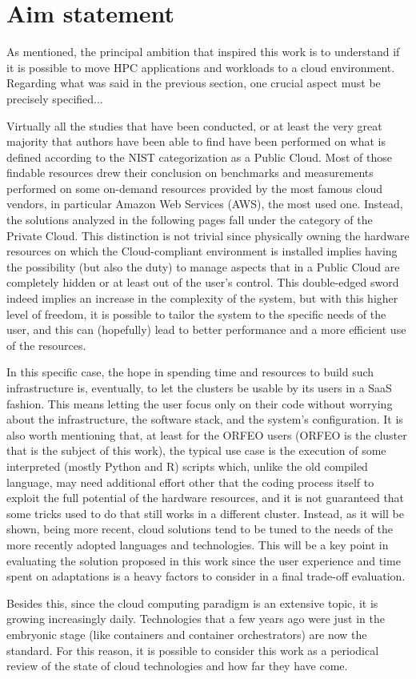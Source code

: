 \section*{Aim statement}

As mentioned, the principal ambition that inspired this work is to understand if
it is possible to move HPC applications and workloads to a cloud environment.
Regarding what was said in the previous section, one crucial aspect must
be precisely specified...

Virtually all the studies that have been conducted, or at least
the very great majority that authors have been able to find have been performed
on what is defined according to the NIST categorization as a Public Cloud.
Most of those findable resources drew their conclusion on benchmarks and
measurements performed on some on-demand resources provided by the most famous
cloud vendors, in particular Amazon Web Services (AWS), the most used one.
Instead, the solutions analyzed in the following pages fall under the category
of the Private Cloud.
This distinction is not trivial since physically owning the hardware resources
on which the Cloud-compliant environment is installed implies having the
possibility (but also the duty) to manage aspects that in a Public Cloud are
completely hidden or at least out of the user's control.
This double-edged sword indeed implies an increase in the complexity of the
system, but with this higher level of freedom, it is possible to tailor the
system to the specific needs of the user, and this can (hopefully) lead to
better performance and a more efficient use of the resources.

In this specific case, the hope in spending time and resources to build such
infrastructure is, eventually, to let the clusters be usable by its users in
a SaaS fashion. This means letting the user focus only on their code without
worrying about the infrastructure, the software stack, and the system's
configuration.
It is also worth mentioning that, at least for the ORFEO users (ORFEO is the
cluster that is the subject of this work), the typical use case is the execution
of some interpreted (mostly Python and R) scripts which, unlike the old compiled
language, may need additional effort other that the coding process itself to
exploit the full potential of the hardware resources, and it is not guaranteed
that some tricks used to do that still works in a different cluster.
Instead, as it will be shown, being more recent, cloud solutions tend to be
tuned to the needs of the more recently adopted languages and technologies.
This will be a key point in evaluating the solution proposed in this work since
the user experience and time spent on adaptations is a heavy factors to consider
in a final trade-off evaluation.

Besides this, since the cloud computing paradigm is an extensive topic, it is
growing increasingly daily. Technologies that a few years ago were just in
the embryonic stage (like containers and container orchestrators) are now the
standard. For this reason, it is possible to consider this work as a periodical
review of the state of cloud technologies and how far they have come.
